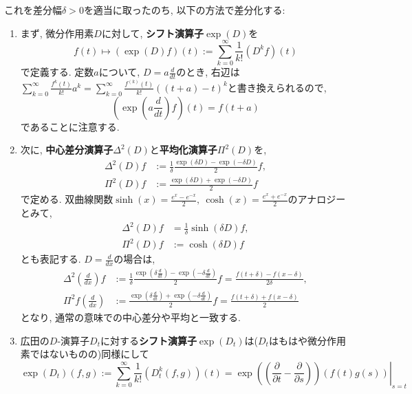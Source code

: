 \documentclass[a4paper]{ujarticle}
\numberwithin{equation}{section}
\theoremstyle{definition}
\begin{document}
    これを差分幅$\delta > 0$を適当に取ったのち, 以下の方法で差分化する:
    \begin{enumerate}
        \item まず, 微分作用素$D$に対して, \textbf{シフト演算子}$\exp(D)$を
        \[
            f(t) \mapsto (\exp(D) f)(t) := \sum_{k = 0}^{\infty} \frac{1}{k!} (D^{k}f)(t)
        \]
        で定義する. 定数$a$について, $\displaystyle D = a \frac{d}{d t}$のとき, 
        右辺は$\displaystyle \sum_{k = 0}^{\infty} \frac{f^{k}(t)}{k!} a^k = \sum_{k = 0}^{\infty} \frac{f^{(k)}(t)}{k!}((t + a) - t)^k$と書き換えられるので,
        \[
            \left(\exp(a \frac{d}{d t}) f\right)(t) = f(t + a)
        \]  
        であることに注意する. 
        \item 次に, \textbf{中心差分演算子}$\Delta^2(D)$と\textbf{平均化演算子}$\Pi^2(D)$を, 
        \begin{align}
            \Delta^2(D) f &:= \frac{1}{\delta} \frac{\exp(\delta D) - \exp( - \delta D)}{2} f, \\
            \Pi^2(D) f &:= \frac{\exp(\delta D) + \exp(- \delta D)}{2} f
        \end{align}
        で定める. 双曲線関数$\displaystyle \sinh(x) = \frac{e^{x} - e^{-x}}{2}, \ \cosh(x) = \frac{e^{x} + e^{-x}}{2}$のアナロジーとみて,
        \begin{align}
            \Delta^2(D) f &= \frac{1}{\delta} \sinh(\delta D) f, \\
            \Pi^2(D) f &:= \cosh(\delta D)f
        \end{align}
        とも表記する. $\displaystyle D = \frac{d}{d x}$の場合は, 
        \begin{align}
            \Delta^2(\frac{d}{d x}) f &:= \frac{1}{\delta} \frac{\exp(\delta \frac{d}{d t}) - \exp( - \delta \frac{d}{d t})}{2} f = \frac{f(t + \delta) - f(x - \delta)}{2 \delta}, \\
            \Pi^2 f(\frac{d}{d x}) &:= \frac{\exp(\delta \frac{d}{d t}) + \exp(- \delta \frac{d}{d t})}{2} f =  \frac{f(t + \delta) + f(x - \delta)}{2}
        \end{align}
        となり, 通常の意味での中心差分や平均と一致する.
        \item 広田の$D$-演算子$D_t$に対する\textbf{シフト演算子}$\exp(D_t)$は($D_t$はもはや微分作用素ではないものの)同様にして
        \begin{equation}
            \exp(D_t)(f, g) := \sum_{k = 0}^{\infty} \frac{1}{k!} (D_{t}^{k}(f, g))(t) = \left. \exp(\left(\frac{\partial}{\partial t} - \frac{\partial}{\partial s}\right)) (f(t) g(s)) \right|_{s = t}

\end{equation}
\end{enumerate}
\end{document}
